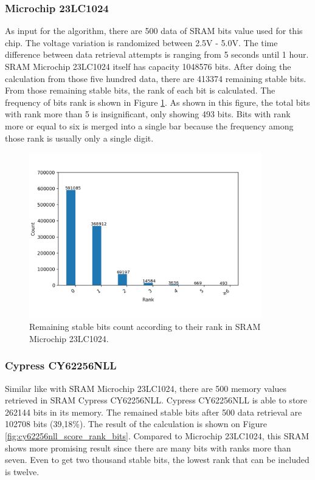 \subsubsection{Microchip 23LC1024}
As input for the algorithm, there are 500 data of SRAM bits value used for this chip. The voltage variation is randomized between 2.5V - 5.0V. The time difference between data retrieval attempts is ranging from 5 seconds until 1 hour.
SRAM Microchip 23LC1024 itself has capacity 1048576 bits. After doing the calculation from those five hundred data, there are 413374 remaining stable bits. From those remaining stable bits, the rank of each bit is calculated. The frequency of bits rank is shown in Figure \ref{fig:23lc1024_score_rank_bits}. As shown in this figure, the total bits with rank more than 5 is insignificant, only showing 493 bits. Bits with rank more or equal to six is merged into a single bar because the frequency among those rank is usually only a single digit.

\begin{figure}[tph!]
    \centerline{\includegraphics[width={0.9\textwidth}]{images/23lc1024_score_rank_bits}}
    \caption{Remaining stable bits count according to their rank in SRAM Microchip 23LC1024.}
    \label{fig:23lc1024_score_rank_bits}
\end{figure}

\subsubsection{Cypress CY62256NLL}
Similar like with SRAM Microchip 23LC1024, there are 500 memory values retrieved in SRAM Cypress CY62256NLL.
Cypress CY62256NLL is able to store 262144 bits in its memory. The remained stable bits after 500 data retrieval are 102708 bits (39,18\%).
The result of the calculation is shown on Figure \ref{fig:cy62256nll_score_rank_bits}. Compared to Microchip 23LC1024, this SRAM shows more promising result since there are many bits with ranks more than seven. Even to get two thousand stable bits, the lowest rank that can be included is twelve.

